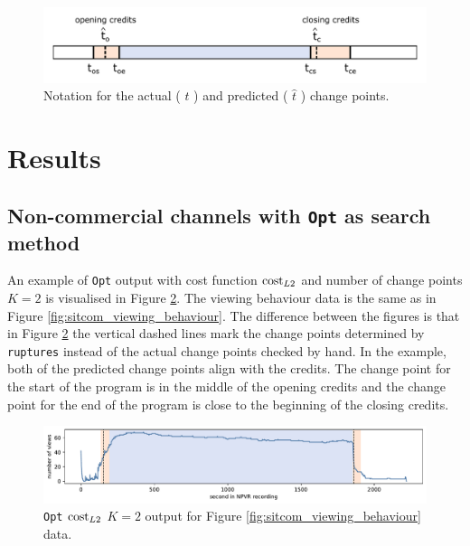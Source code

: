 \begin{figure}[H]
    \centering
    \includegraphics[width=1\textwidth]{../plots/timeline.pdf}
    \caption{Notation for the actual ( $t$ ) and predicted ( $\hat{t}$ ) change points.}
    \label{fig:change_point_notation}
\end{figure}

\newpage
\section{Results} \label{sec:results}

\subsection{Non-commercial channels with \texttt{Opt} as search method} \label{sec:results_opt}

An example of \texttt{Opt} output with cost function $\operatorname{cost}_{L2}$ and number of change points $K=2$ is visualised in Figure \ref{fig:opt_sitcom}. The viewing behaviour data is the same as in Figure \ref{fig:sitcom_viewing_behaviour}. The difference between the figures is that in Figure \ref{fig:opt_sitcom} the vertical dashed lines mark the change points determined by \texttt{ruptures} instead of the actual change points checked by hand. In the example, both of the predicted change points align with the credits. The change point for the start of the program is in the middle of the opening credits and the change point for the end of the program is close to the beginning of the closing credits.

\begin{figure}[h]
  \centering
  \includegraphics[width=1\textwidth]{../plots/sitcom-pelt_l2_pen30000.pdf}
  \caption{\texttt{Opt} $\operatorname{cost}_{L2}$ $K=2$ output for Figure \ref{fig:sitcom_viewing_behaviour} data.}
  \label{fig:opt_sitcom}
\end{figure}


